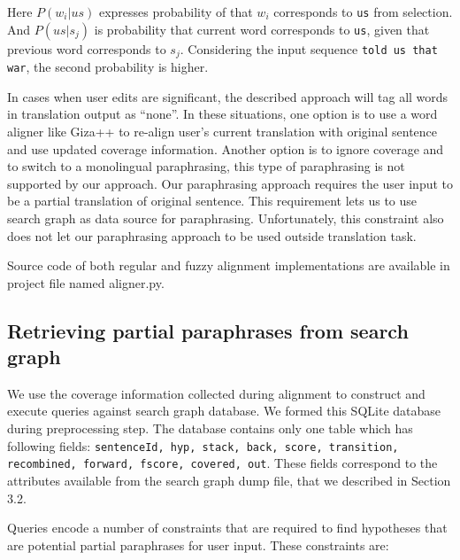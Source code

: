 Here $P(w_{i}|us)$ expresses probability of that $w_{i}$ corresponds to \texttt{us} from selection. And $P(us|s_{j})$ is probability that current word corresponds to \texttt{us}, given that previous word corresponds to $s_{j}$. Considering the input sequence \texttt{told us that war}, the second probability is higher.

In cases when user edits are significant, the described approach will tag all words in translation output as ``none''. In these situations, one option is to use a word aligner like Giza++ to re-align user's current translation with original sentence and use updated coverage information. Another option is to ignore coverage and to switch to a monolingual paraphrasing, this type of paraphrasing is not supported by our approach. Our paraphrasing approach requires the user input to be a partial translation of original sentence. This requirement lets us to use search graph as data source for paraphrasing. Unfortunately, this constraint also does not let our paraphrasing approach to be used outside translation task.

Source code of both regular and fuzzy alignment implementations are available in project file named \textsf{aligner.py}. 

\subsection{Retrieving partial paraphrases from search graph}

We use the coverage information collected during alignment to construct and execute queries against search graph database. We formed this SQLite database during preprocessing step. The database contains only one table which has following fields: \texttt{sentenceId, hyp, stack, back, score, transition, recombined, forward, fscore, covered, out}. These fields correspond to the attributes available from the search graph dump file, that we described in Section 3.2. 

Queries encode a number of constraints that are required to find hypotheses that are potential partial paraphrases for user input. These constraints are:

